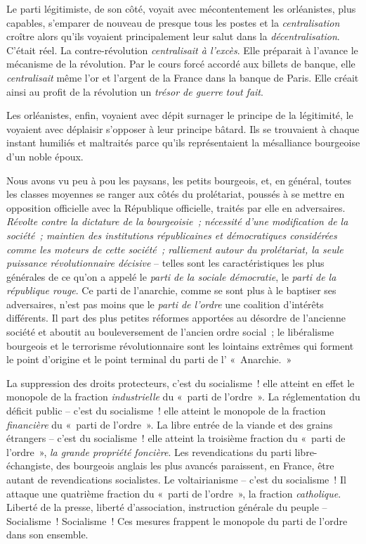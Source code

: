 \documentclass[twoside]{book} %
\begin{document}
Le parti légitimiste, de son côté, voyait avec mécontentement les orléanistes, plus capables, s’emparer de nouveau de presque tous les postes et la \emph{centralisation} croître alors qu’ils voyaient principalement leur salut dans la \emph{décentralisation}. C’était réel. La contre-révolution \emph{centralisait à l’excès}. Elle préparait à l’avance le mécanisme de la révolution. Par le cours forcé accordé aux billets de banque, elle \emph{centralisait} même l’or et l’argent de la France dans la banque de Paris. Elle créait ainsi au profit de la révolution un \emph{trésor de guerre tout fait}.\par
Les orléanistes, enfin, voyaient avec dépit surnager le principe de la légitimité, le voyaient avec déplaisir s’opposer à leur principe bâtard. Ils se trouvaient à chaque instant humiliés et maltraités parce qu’ils représentaient la mésalliance bourgeoise d’un noble époux.\par
Nous avons vu peu à pou les paysans, les petits bourgeois, et, en général, toutes les classes moyennes se ranger aux côtés du prolétariat, poussés à se mettre en opposition officielle avec la République officielle, traités par elle en adversaires. \emph{Révolte contre la dictature de la bourgeoisie ; nécessité d’une modification de la société ; maintien des institutions républicaines et démocratiques considérées comme les moteurs de cette société ; ralliement autour du prolétariat, la seule puissance révolutionnaire décisive} – telles sont les caractéristiques les plus générales de ce qu’on a appelé le \emph{parti de la sociale démocratie}, le \emph{parti de la république rouge}. Ce parti de l’anarchie, comme se sont plus à le baptiser ses adversaires, n’est pas moins que le \emph{parti de l’ordre} une coalition d’intérêts différents. Il part des plus petites réformes apportées au désordre de l’ancienne société et aboutit au bouleversement de l’ancien ordre social ; le libéralisme bourgeois et le terrorisme révolutionnaire sont les lointains extrêmes qui forment le point d’origine et le point terminal du parti de l’ « Anarchie. »\par
La suppression des droits protecteurs, c’est du socialisme ! elle atteint en effet le monopole de la fraction \emph{industrielle} du « parti de l’ordre ». La réglementation du déficit public – c’est du socialisme ! elle atteint le monopole de la fraction \emph{financière} du « parti de l’ordre ». La libre entrée de la viande et des grains étrangers – c’est du socialisme ! elle atteint la troisième fraction du « parti de l’ordre », \emph{la grande propriété foncière}. Les revendications du parti libre-échangiste, des bourgeois anglais les plus avancés paraissent, en France, être autant de revendications socialistes. Le voltairianisme – c’est du socialisme ! Il attaque une quatrième fraction du « parti de l’ordre », la fraction \emph{catholique}. Liberté de la presse, liberté d’association, instruction générale du peuple – Socialisme ! Socialisme ! Ces mesures frappent le monopole du parti de l’ordre dans son ensemble.\par
\end{document}
